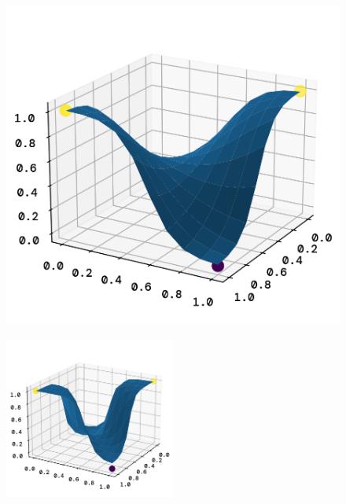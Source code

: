 \documentclass[twoside,11pt]{report}
\begin{document}
\begin{figure}[h]
\begin{minipage}{0.5\textwidth - 1mm}
\begin{center}
                \includegraphics[width=\textwidth]{../runsAndFigures/xor_poly.png}
                \caption{}\label{fig:xor_poly}
            \end{center}
        \end{minipage}
    \end{figure}



    \begin{figure}[!h]
        \begin{center}
            \includegraphics[width=0.5\textwidth]{../runsAndFigures/xor_nn.png}
        \end{center}
        \caption{}\label{fig:xor_nn}
    \end{figure}
\end{document}
